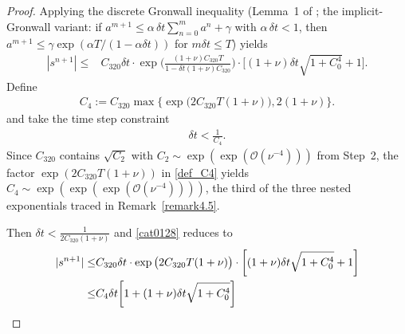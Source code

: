 \documentclass{article}
\theoremstyle{definition}                   %
\begin{document}
\begin{proof}
Applying the discrete Gronwall inequality (Lemma~1 of \cite{HuangShen2023}; the implicit-Gronwall variant: if $a^{m+1}\le \alpha\,\delta t\sum_{n=0}^{m}a^n + \gamma$ with $\alpha\,\delta t<1$, then $a^{m+1}\le \gamma\exp(\alpha T/(1-\alpha\delta t))$ for $m\delta t\le T$) yields
\begin{align}
|s^{n+1}| \le& 
C_{320} \delta t \cdot \exp\bigg(\frac{(1+\nu)C_{320}T}{1-\delta t (1+\nu) C_{320}} \bigg)
\cdot 
\bigg[ (1+\nu) \delta t \sqrt{1+C_0^4} +1 \bigg].
\label{cat0128}
\end{align}
Define
\begin{align}
C_4 := C_{320} \max\bigg\{ \exp\bigg( 2C_{320} T(1+\nu)\bigg), 
2(1+\nu)\bigg\}.
\label{def_C4}
\end{align}
and take the time step constraint 
\begin{align}
\delta t < \frac{1}{C_4}.
\label{5.67-new}
\end{align}
Since $C_{320}$ contains $\sqrt{C_2}$ with $C_2\sim \exp(\exp(\mathcal{O}(\nu^{-4})))$ from Step~2, the factor $\exp(2C_{320}T(1+\nu))$ in \eqref{def_C4} yields $C_4\sim \exp(\exp(\exp(\mathcal{O}(\nu^{-4}))))$, the third of the three nested exponentials traced in Remark~\ref{remark4.5}.

Then $\delta t< \frac{1}{2C_{320} (1+\nu)}$ and \eqref{cat0128} reduces to
\begin{align}
|s^{n+1}|
\le & C_{320}\delta t\cdot  \exp\big(2C_{320} T(1+\nu)\big)  
\cdot
\bigg[ (1+\nu)\delta t\sqrt{1+C_0^4} +1 \bigg]
\notag \\
\le &C_4 \delta t \bigg[ 1+ (1+\nu)\delta t\sqrt{1+C_0^4} \bigg]
\label{5.65-new}
\end{align}


\end{proof}
\end{document}
